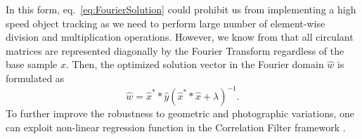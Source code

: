 \documentclass{bmvc2k}
\begin{document}

In this form, eq.~\ref{eq:FourierSolution} could prohibit us from implementing a
high speed object tracking as we need to perform large number of
element-wise division and multiplication operations. However, we know
from \cite{gray2006toeplitz} that all circulant matrices are
represented diagonally by the Fourier Transform regardless of the base
sample $x$.
Then, the optimized solution vector in the Fourier domain $\hat{w}$ is formulated as
\begin{equation}
\hat{w} = \hat{x}^{*}*\hat{y}(\hat{x}^{*}*\hat{x}+\lambda)^{-1}.
\label{eq:DiagonalizedPrimalSolution}
\end{equation}
To further improve the robustness to geometric and photographic variations, one can exploit non-linear
regression function in the Correlation Filter framework \cite{henriques2015high}. 
\end{document}
